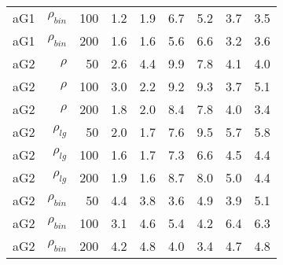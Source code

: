 \documentclass[twoside,11pt]{article}
\begin{document}
\begin{table}
\begin{tabular}{rrrrrrrrr}
aG1   & $\rho_{bin}$ & 100   & 1.2   & 1.9   & 6.7   & 5.2   & 3.7   & 3.5 \\
aG1   & $\rho_{bin}$ & 200   & 1.6   & 1.6   & 5.6   & 6.6   & 3.2   & 3.6 \bigstrut[b]\\
\hline
aG2   & $\rho$ & 50    & 2.6   & 4.4   & 9.9   & 7.8   & 4.1   & 4.0 \bigstrut[t]\\
aG2   & $\rho$ & 100   & 3.0   & 2.2   & 9.2   & 9.3   & 3.7   & 5.1 \\
aG2   & $\rho$ & 200   & 1.8   & 2.0   & 8.4   & 7.8   & 4.0   & 3.4 \bigstrut[b]\\
\hline
aG2   & $\rho_{lg}$ & 50    & 2.0   & 1.7   & 7.6   & 9.5   & 5.7   & 5.8 \bigstrut[t]\\
aG2   & $\rho_{lg}$ & 100   & 1.6   & 1.7   & 7.3   & 6.6   & 4.5   & 4.4 \\
aG2   & $\rho_{lg}$ & 200   & 1.9   & 1.6   & 8.7   & 8.0   & 5.0   & 4.4 \bigstrut[b]\\
\hline
aG2   & $\rho_{bin}$ & 50    & 4.4   & 3.8   & 3.6   & 4.9   & 3.9   & 5.1 \bigstrut[t]\\
aG2   & $\rho_{bin}$ & 100   & 3.1   & 4.6   & 5.4   & 4.2   & 6.4   & 6.3 \\
aG2   & $\rho_{bin}$ & 200   & 4.2   & 4.8   & 4.0   & 3.4   & 4.7   & 4.8 \bigstrut[b]\\
\hline
\end{tabular}%

\label{varrank2}%
\end{table}%
\end{document}
